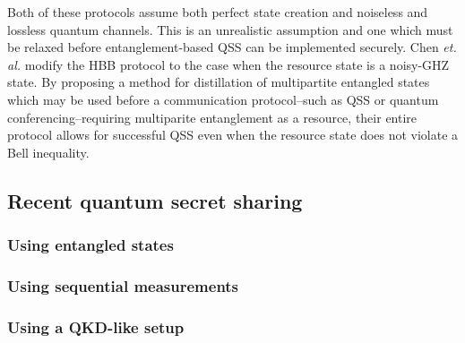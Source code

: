 Both of these protocols \cite{Hillery1999, Karlsson1999} assume both perfect state creation and noiseless and lossless quantum channels. This is an unrealistic assumption and one which must be relaxed before entanglement-based QSS can be implemented securely. Chen \emph{et. al.} \cite{Chen2005a} modify the HBB protocol to the case when the resource state is a noisy-GHZ state. By proposing a method for distillation of multipartite entangled states which may be used before a communication protocol--such as QSS or quantum conferencing--requiring multiparite entanglement as a resource, their entire protocol allows for successful QSS even when the resource state does not violate a Bell inequality.












\subsection*{Recent quantum secret sharing}

\subsubsection*{Using entangled states}
\subsubsection*{Using sequential measurements}
\subsubsection*{Using a QKD-like setup}